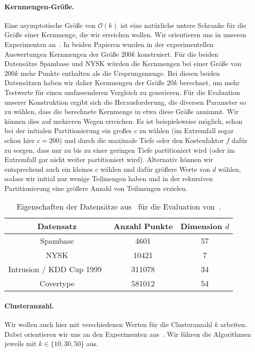 \paragraph{Kernmengen-Größe.}
Eine asymptotische Größe von $\mathcal{O}(k)$ ist eine natürliche untere Schranke für die Größe einer Kernmenge, die wir
erreichen wollen. Wir orientieren uns in unseren Experimenten an~\cite{AckermannMRSLS12,FichtenbergerGSSS13}. In beiden Papieren
wurden in der experimentellen Auswertungen Kernmengen der Größe $200k$ konstruiert. Für die beiden Datensätze Spambase und
NYSK würden die Kernmengen bei einer Größe von $200k$ mehr Punkte enthalten als die Ursprungsmenge. Bei diesen beiden Datensätzen
haben wir daher Kernmengen der Größe $20k$ berechnet, um mehr Testwerte für einen umfassenderen Vergleich zu generieren.
Für die Evaluation unserer Konstruktion
ergibt sich die Herausforderung, die diversen Parameter so zu wählen, dass die berechnete Kernmenge in etwa diese
Größe annimmt. Wir können dies auf mehreren Wegen erreichen. Es ist beispielsweise möglich, schon bei
der initialen Partitionierung ein großes $c$ zu wählen (im Extremfall sogar schon hier $c=200$) und durch die maximale Tiefe
oder den Kostenfaktor $f$ dafür zu sorgen, dass nur zu bis zu einer geringen Tiefe partitioniert wird (oder im Extremfall
gar nicht weiter partitioniert wird). Alternativ können wir entsprechend auch ein kleines $c$ wählen und dafür größere
Werte von $d$ wählen, sodass wir initial nur wenige Teilmengen haben und in der rekursiven Partitionierung eine größere
Anzahl von Teilmengen erzielen.

\begin{table}[t]
\centering
\begin{tabular}{@{}ccc@{}} \toprule
	\textbf{Datensatz} & \textbf{Anzahl Punkte} & \textbf{Dimension} $d$ \\ \midrule
	Spambase & 4601 & 57 \\
	NYSK & 10421  & 7 \\
	Intrusion / KDD Cup 1999~\cite{AckermannMRSLS12} & 311078 & 34 \\
	Covertype & 581012 & 54 \\ \bottomrule
\end{tabular}
\caption{Eigenschaften der Datensätze aus~\cite{Lichman13} für die Evaluation von~\CsTwo.}
\label{tbl:experiment-coresets-datasets}
\end{table}

\paragraph{Clusteranzahl.} Wir wollen auch hier mit verschiedenen Werten für die Clusteranzahl $k$ arbeiten.
Dabei orientieren wir uns an den Experimenten aus~\cite{AckermannMRSLS12,FichtenbergerGSSS13}. Wir führen die Algorithmen
jeweils mit $k \in \{ 10, 30, 50 \}$ aus.

